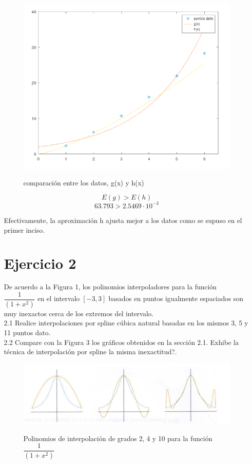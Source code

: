 \documentclass{article}
\begin{document}
\begin{figure}[H]
    \centering
    \includegraphics[width=1\linewidth]{ej1_a.png}
    \label{fig:enter-label}
    \caption{comparación entre los datos, g(x) y h(x)}
\end{figure}

\[ 
E(g) > E(h)
\]
\[
63.793  > 2.5469 \cdot 10^{-3}
\]

Efectivamente, la aproximación h ajusta mejor a los datos como se supuso en el primer inciso.

\section{Ejercicio 2}
De acuerdo a la Figura 1, los polinomios interpoladores para la función $\dfrac{1}{(1 + x^2)}$ en el
intervalo $[−3, 3]$ basados en puntos igualmente espaciados son muy inexactos cerca de los extremos
del intervalo.\\
2.1 Realice interpolaciones por spline cúbica natural basadas en los mismos 3, 5 y 11 puntos dato.\\
2.2 Compare con la Figura 3 los gráficos obtenidos en la sección 2.1. Exhibe la técnica de
interpolación por spline la misma inexactitud?.\\

\begin{figure}[H]
    \centering
    \includegraphics[width=1\linewidth]{Screenshot_20231019_181840.png}
    \label{fig:enter-label}
    \caption{Polinomios de interpolación de grados 2, 4 y 10 para la función  $\dfrac{1}{(1 + x^2)}$}
\end{figure}
\end{document}
